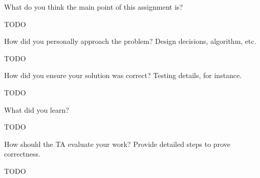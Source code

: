 \documentclass{article}
\newenvironment{question}[2][Question]{\begin{trivlist}
\item[\hskip \labelsep {\bfseries #1}\hskip \labelsep {\bfseries #2.}]}{\end{trivlist}}
\begin{document}
\begin{question}{1}
What do you think the main point of this assignment is?
\end{question}
TODO


\vspace{0.25in} %

\begin{question}{2}
How did you personally approach the problem? Design decisions, algorithm, etc.\end{question}
TODO


\vspace{0.25in} %

\begin{question}{3}
How did you ensure your solution was correct? Testing details, for instance.
\end{question}
TODO


\vspace{0.25in}
\begin{question}{4}
What did you learn?
\end{question}
TODO


\vspace{0.25in}
\begin{question}{4}
How should the TA evaluate your work? Provide detailed steps to prove correctness.
\end{question}
TODO

\end{document}
